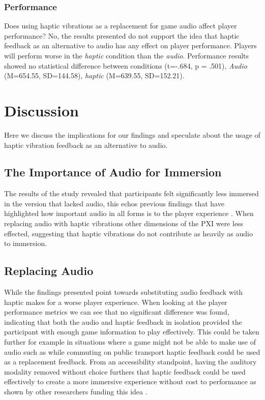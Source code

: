 \documentclass[manuscript,screen]{acmart}
\begin{document}
\subsubsection{Performance}
Does using haptic vibrations as a replacement for game audio affect player performance? No, the results presented do not support the idea that haptic feedback as an alternative to audio has any effect on player performance. Players will perform worse in the \textit{haptic} condition than the \textit{audio}. Performance results showed no statistical difference between conditions (t=-.684, p = .501), \textit{Audio} (M=654.55, SD=144.58), \textit{haptic} (M=639.55, SD=152.21).

\section{Discussion}
Here we discuss the implications for our findings and speculate about the usage of haptic vibration feedback as an alternative to audio.

\subsection{The Importance of Audio for Immersion}
The results of the study revealed that participants felt significantly less immersed in the version that lacked audio, this echos previous findings that have highlighted how important audio in all forms is to the player experience \cite{rogers2017exploring}. When replacing audio with haptic vibrations other dimensions of the PXI were less effected, suggesting that haptic vibrations do not contribute as heavily as audio to immersion. 
\subsection{Replacing Audio}
While the findings presented point towards substituting audio feedback with haptic makes for a worse player experience. When looking at the player performance metrics we can see that no significant difference was found, indicating that both the audio and haptic feedback in isolation provided the participant with enough game information to play effectively. This could be taken further for example in situations where a game might not be able to make use of audio such as while commuting on public transport haptic feedback could be used as a replacement feedback. From an accessibility standpoint, having the auditory modality removed without choice furthers that haptic feedback could be used effectively to create a more immersive experience without cost to performance as shown by other researchers funding this idea \cite{mirzaei2020earvr}.
\end{document}
